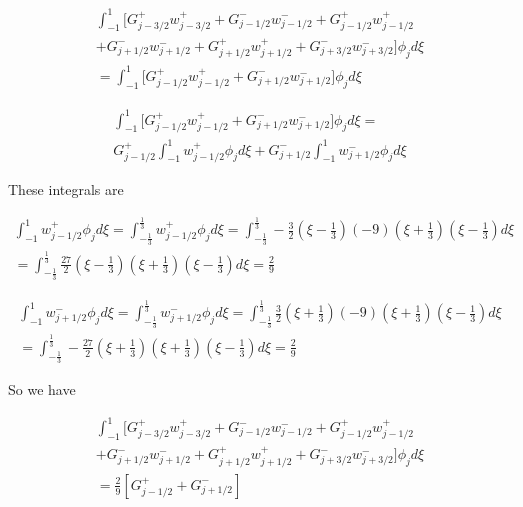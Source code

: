 \documentclass[12pt]{article}
\begin{document}
\begin{multline*}
\int_{-1}^{1}\bigg[G^+_{j - 3/2}w^+_{j - 3/2} + G^-_{j - 1/2}w^-_{j - 1/2} + G^+_{j - 1/2}w^+_{j - 1/2} \\+ G^-_{j + 1/2}w^-_{j + 1/2} + G^+_{j + 1/2}w^+_{j + 1/2} + G^-_{j + 3/2}w^-_{j + 3/2}\bigg] \phi_{j} d\xi \\= \int_{-1}^{1}\bigg[G^+_{j - 1/2}w^+_{j - 1/2} + G^-_{j + 1/2}w^-_{j + 1/2} \bigg] \phi_{j} d\xi
\end{multline*}

\begin{multline*}
\int_{-1}^{1}\bigg[G^+_{j - 1/2}w^+_{j - 1/2} + G^-_{j + 1/2}w^-_{j + 1/2} \bigg] \phi_{j} d\xi = \\ G^+_{j - 1/2} \int_{-1}^{1}w^+_{j - 1/2} \phi_{j}d\xi + G^-_{j + 1/2}\int_{-1}^{1}w^-_{j + 1/2}  \phi_{j} d\xi
\end{multline*}

These integrals are

\begin{multline*}
\int_{-1}^{1}w^+_{j - 1/2} \phi_{j}d\xi =\int_{-\frac{1}{3}}^{\frac{1}{3}}w^+_{j - 1/2} \phi_{j}d\xi  = \int_{-\frac{1}{3}}^{\frac{1}{3}}-\frac{3}{2}\left(\xi - \frac{1}{3}\right) (-9)\left(\xi + \frac{1}{3}\right)\left(\xi - \frac{1}{3}\right)d\xi \\ = \int_{-\frac{1}{3}}^{\frac{1}{3}}\frac{27}{2}\left(\xi - \frac{1}{3}\right) \left(\xi + \frac{1}{3}\right)\left(\xi - \frac{1}{3}\right)d\xi = \frac{2}{9}
\end{multline*}

\begin{multline*}
\int_{-1}^{1}w^-_{j + 1/2} \phi_{j}d\xi =\int_{-\frac{1}{3}}^{\frac{1}{3}}w^-_{j + 1/2} \phi_{j}d\xi = \int_{-\frac{1}{3}}^{\frac{1}{3}}\frac{3}{2}\left(\xi + \frac{1}{3}\right) (-9)\left(\xi + \frac{1}{3}\right)\left(\xi - \frac{1}{3}\right)d\xi
\\= \int_{-\frac{1}{3}}^{\frac{1}{3}}-\frac{27}{2}\left(\xi + \frac{1}{3}\right)\left(\xi + \frac{1}{3}\right)\left(\xi - \frac{1}{3}\right)d\xi  = \frac{2}{9} 
\end{multline*}

So we have 

\begin{multline*}
\int_{-1}^{1}\bigg[G^+_{j - 3/2}w^+_{j - 3/2} + G^-_{j - 1/2}w^-_{j - 1/2} + G^+_{j - 1/2}w^+_{j - 1/2} \\+ G^-_{j + 1/2}w^-_{j + 1/2} + G^+_{j + 1/2}w^+_{j + 1/2} + G^-_{j + 3/2}w^-_{j + 3/2}\bigg] \phi_{j} d\xi \\=  \frac{2}{9} \left[G^+_{j - 1/2} + G^-_{j + 1/2}\right]
\end{multline*}
\end{document}
